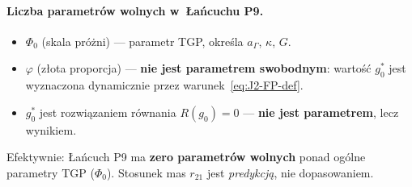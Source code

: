 \paragraph{Liczba parametr\'ow wolnych w~\L{}a\'ncuchu P9.}
\begin{itemize}[nosep]
  \item $\Phi_0$ (skala pr\'o\.zni) --- parametr TGP, okre\'sla $a_\Gamma$, $\kappa$, $G$.
  \item $\varphi$ (z\l{}ota proporcja) --- \textbf{nie jest parametrem swobodnym}:
    warto\'s\'c $g_0^*$ jest wyznaczona dynamicznie przez
    warunek~\eqref{eq:J2-FP-def}.
  \item $g_0^*$ jest rozwi\k{a}zaniem r\'ownania $R(g_0) = 0$
    --- \textbf{nie jest parametrem}, lecz wynikiem.
\end{itemize}
Efektywnie: \L{}a\'ncuch P9 ma \textbf{zero parametr\'ow wolnych}
ponad og\'olne parametry TGP ($\Phi_0$).
Stosunek mas $r_{21}$ jest \emph{predykcj\k{a}},
nie dopasowaniem.
